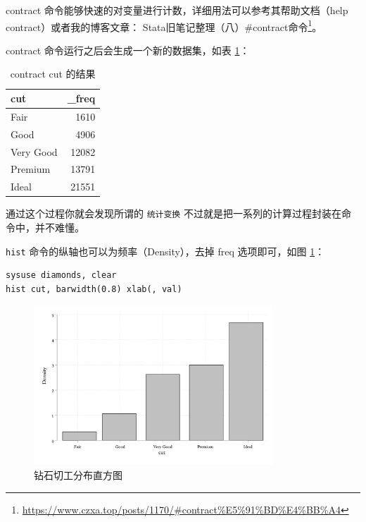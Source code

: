 \documentclass[]{ctexbook}
\renewcommand{\href}[2]{#2\footnote{\url{#1}}}
\begin{document}
contract 命令能够快速的对变量进行计数，详细用法可以参考其帮助文档（help contract）或者我的博客文章： \href{https://www.czxa.top/posts/1170/\#contract\%E5\%91\%BD\%E4\%BB\%A4}{Stata旧笔记整理（八）\#contract命令}。

contract 命令运行之后会生成一个新的数据集，如表 \ref{tab:cut}：

\begin{table}[t]

\caption{\label{tab:cut}contract cut 的结果}
\centering
\begin{tabular}{lr}
\toprule
cut & \_freq\\
\midrule
Fair & 1610\\
Good & 4906\\
Very Good & 12082\\
Premium & 13791\\
Ideal & 21551\\
\bottomrule
\end{tabular}
\end{table}

通过这个过程你就会发现所谓的 \texttt{统计变换} 不过就是把一系列的计算过程封装在命令中，并不难懂。

\texttt{hist} 命令的纵轴也可以为频率（Density），去掉 freq 选项即可，如图 \ref{fig:histcut2}：

\begin{lstlisting}
sysuse diamonds, clear
hist cut, barwidth(0.8) xlab(, val)
\end{lstlisting}

\begin{figure}

{\centering \includegraphics[width=0.8\textwidth]{assets/histcut2} 

}

\caption{钻石切工分布直方图}\label{fig:histcut2}
\end{figure}
\end{document}
